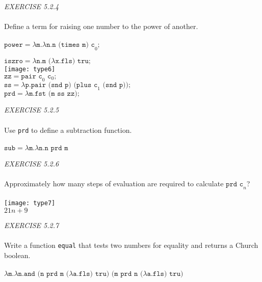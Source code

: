 \documentclass{article}
\begin{document}
\begin{siderules}\color{blue}\textit{EXERCISE 5.2.4}\color{black}\\\\
        \color{blue}Define a term for raising one number to the power of another.\\\\\color{black}
        \(\texttt{power}=\lambda \texttt{m.}\lambda \texttt{n.n (times m) c}_{0}\texttt{;}\)
\end{siderules}
\(\texttt{iszro}=\lambda \texttt{n.m (}\lambda \texttt{x.fls) tru;}\)\\
\texttt{[image: type6]}\\
\(\texttt{zz}=\texttt{pair c}_{0} \texttt{ c}_{0}\texttt{;}\)\\
\(\texttt{ss}=\lambda \texttt{p.pair (snd p) (plus c}_{1}\texttt{ (snd p));}\)\\
\(\texttt{prd}=\lambda \texttt{m.fst (m ss zz);}\)
\begin{siderules}\color{blue}\textit{EXERCISE 5.2.5}\color{black}\\\\
    \color{blue}Use \texttt{prd} to define a subtraction function.\\\\\color{black}
    \(\texttt{sub}=\lambda \texttt{m.}\lambda \texttt{n.n prd m}\)
\end{siderules}
\begin{siderules}\color{blue}\textit{EXERCISE 5.2.6}\color{black}\\\\
    \color{blue} Approximately how many steps of evaluation are required to calculate \(\texttt{prd c}_{n}\)?\\\\\color{black}
    \texttt{[image: type7]}\\
    \(21n+9\)
\end{siderules}
\begin{siderules}\color{blue}\textit{EXERCISE 5.2.7}\color{black}\\\\
    \color{blue} Write a function \texttt{equal} that tests two numbers for equality and returns a Church boolean.\\\\\color{black}
    \(\lambda \texttt{m.}\lambda \texttt{n.and (n prd m (}\lambda \texttt{a.fls) tru) (m prd n (}\lambda \texttt{a.fls) tru)} \)
\end{siderules}
\end{document}
